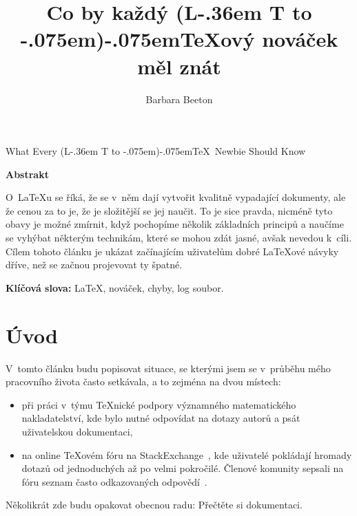 \documentclass[oldcsbabel]{csbulletin}
\makeatletter
\DeclareRobustCommand{\La}{L\kern-.36em%
        {\sbox\z@ T%
         \vbox to\ht\z@{\hbox{\check@mathfonts
                              \fontsize\sf@size\z@
                              \math@fontsfalse\selectfont
                              A}%
                        \vss}%
        }}
\def\AllTeX{(\La\kern-.075em)\kern-.075em\TeX}
\makeatother
\begin{document}
\title
  {Co by každý \AllTeX ový nováček měl znát}
\EnglishTitle
  {What Every \AllTeX\ Newbie Should Know}
\author{Barbara Beeton}

\maketitle[3pt]

\begin{narrower}

{\hfil\bf Abstrakt}\medskip

O~\LaTeX u se říká, že se v~něm dají vytvořit kvalitně vypadající dokumenty,
ale že cenou za to je, že je složitější se jej naučit.
To je sice pravda, nicméně tyto obavy je možné zmírnit, když pochopíme několik základních principů a naučíme se vyhýbat některým technikám, které se mohou zdát jasné, avšak nevedou k~cíli. Cílem tohoto článku je ukázat začínajícím uživatelům dobré \LaTeX ové návyky dříve, než se začnou projevovat ty špatné.

\medskip\noindent
{\bf Klíčová slova:}
\LaTeX, nováček, chyby, log soubor.

\end{narrower}

\makeatletter
\def\@thefnmark{}
\makeatother

\section{Úvod}

V~tomto článku budu popisovat situace, se kterými jsem se v~průběhu mého pracovního života často setkávala, a to zejména na dvou místech:
\begin{itemize}
\item při práci v~týmu \TeX nické podpory významného matematického nakladatelství, kde bylo nutné odpovídat na dotazy autorů a psát uživatelskou dokumentaci,
\item na online \TeX ovém fóru na StackExchange~\cite{TSE}, kde uživatelé pokládají hromady dotazů od jednoduchých až po velmi pokročilé. Členové komunity sepsali na fóru seznam často odkazovaných odpovědí~\cite{2419}.
\end{itemize}
Několikrát zde budu opakovat obecnou radu: Přečtěte si dokumentaci.
\end{document}

